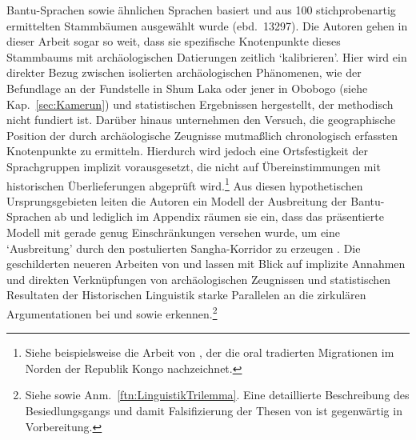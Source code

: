 \begin{multicols}{2}
Bantu-Sprachen sowie ähnlichen Sprachen basiert und aus 100 stichprobenartig ermittelten Stammbäumen ausgewählt wurde (ebd.~13297). Die Autoren gehen in dieser Arbeit sogar so weit, dass sie spezifische Knotenpunkte dieses Stammbaums mit archäologischen Datierungen zeitlich \enquote*{kalibrieren}. Hier wird ein direkter Bezug zwischen isolierten archäologischen Phänomenen, wie der Befundlage an der Fundstelle in Shum Laka oder jener in Obobogo (siehe Kap.~\ref{sec:Kamerun}) und statistischen Ergebnissen hergestellt, der methodisch nicht fundiert ist. Darüber hinaus unternehmen \textcite{Grollemund.2015} den Versuch, die geographische Position der durch archäologische Zeugnisse mutmaßlich chronologisch erfassten Knotenpunkte zu ermitteln. Hierdurch wird jedoch eine Ortsfestigkeit der Sprachgruppen implizit vorausgesetzt, die nicht auf Übereinstimmungen mit historischen Überlieferungen abgeprüft wird.\footnote{Siehe beispielsweise die Arbeit von \textcite[83]{Vennetier.1963}, der die oral tradierten Migrationen im Norden der Republik Kongo nachzeichnet.} Aus diesen hypothetischen Ursprungsgebieten leiten die Autoren ein Modell der Ausbreitung der Bantu-Sprachen ab und lediglich im Appendix räumen sie ein, dass das präsentierte Modell mit gerade genug Einschränkungen versehen wurde, um eine \enquote*{Ausbreitung} durch den postulierten \mbox{Sangha}-Korridor zu erzeugen \parencite[SI 3]{Grollemund.2015}. Die geschilderten neueren Arbeiten von \textcite{Bostoen.2015} und \textcite{Grollemund.2015} lassen mit Blick auf implizite Annahmen und direkten Verknüpfungen von archäologischen Zeugnissen und statistischen Resultaten der Historischen Linguistik starke Parallelen an die zirkulären Argumentationen bei \textcites{Phillipson.1976}{Phillipson.1976b}{Phillipson.1977a} und \textcite{Ehret.1973} sowie \textcites{Heine.1973}{Heine.1977} erkennen.\footnote{Siehe \textcites{Eggert.1981}[308\,f.]{Eggert.2005} sowie Anm.~\ref{ftn:LinguistikTrilemma}. Eine detaillierte Beschreibung des Besiedlungsgangs und damit Falsifizierung der Thesen von \textcite{Bostoen.2015} ist gegenwärtig in Vorbereitung.}


\end{multicols}

